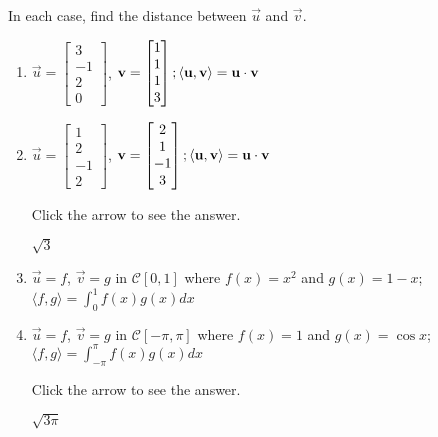 \documentclass{ximera}
\begin{document}
\begin{problem}\label{prob:inner_prod_4}
In each case, find the distance between $\vec{u}$ and $\vec{v}$.

\begin{enumerate} 
\item $\vec{u} = \begin{bmatrix}3\\ -1\\ 2\\ 0\end{bmatrix}$, $\mathbf{v} = \begin{bmatrix}1\\ 1\\ 1\\ 3\end{bmatrix};
\langle \mathbf{u}, \mathbf{v} \rangle = \mathbf{u} \cdot \mathbf{v}$

\item $\vec{u} = \begin{bmatrix}1\\  2\\ -1\\ 2\end{bmatrix}$, $\mathbf{v} = \begin{bmatrix}2\\ 1\\ -1\\ 3\end{bmatrix};
\langle \mathbf{u}, \mathbf{v} \rangle = \mathbf{u} \cdot \mathbf{v}$

Click the arrow to see the answer.
\begin{expandable}
$\sqrt{3}$
\end{expandable}

\item $\vec{u} = f$, $\vec{v} = g $ in $\mathcal{C}[0, 1]$ where $f(x) = x^2 $ and $g(x) = 1 - x$; $\langle f, g \rangle = \int_{0}^{1} f(x)g(x)dx$

\item $\vec{u} = f$, $\vec{v} = g $ in $\mathcal{C}[-\pi, \pi]$ where $f(x) = 1$ and $g(x) = \cos x$; $\langle f, g \rangle = \int_{-\pi}^{\pi} f(x)g(x)dx$

Click the arrow to see the answer.
\begin{expandable}
$\sqrt{3\pi}$
\end{expandable}

\end{enumerate}
\end{problem}
\end{document}
